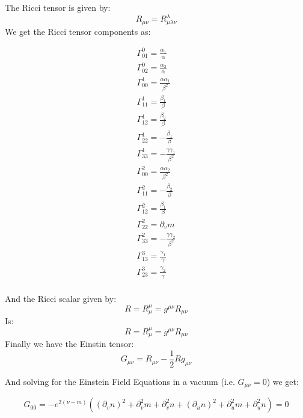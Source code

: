 \documentclass{article}
\begin{document}
The Ricci tensor is given by:
\begin{equation}
R_{\mu\nu}=R_{\mu\lambda\nu}^{\lambda}
\end{equation}
We get the Ricci tensor components as:
\begin{center}
\begin{equation}
\begin{array}{c}
\Gamma_{01}^{0}=\frac{\alpha_{1}}{\alpha}\\
\Gamma_{02}^{0}=\frac{\alpha_{2}}{\alpha}\\
\Gamma_{00}^{1}=\frac{\alpha \alpha_{1}}{\beta^{2}}\\
\Gamma_{11}^{1}=\frac{\beta_{1}}{\beta}\\
\Gamma_{12}^{1}=\frac{\beta_{2}}{\beta}\\
\Gamma_{22}^{1}=-\frac{\beta_{1}}{\beta}\\
\Gamma_{33}^{1}=-\frac{\gamma\gamma_{1}}{\beta^{2}}\\
\Gamma_{00}^{2}=\frac{\alpha\alpha_{2}}{\beta^{2}}\\
\Gamma_{11}^{2}=-\frac{\beta_{2}}{\beta}\\
\Gamma_{12}^{2}=\frac{\beta_{1}}{\beta}\\ 
\Gamma_{22}^{2}=\partial_{v}m\\
\Gamma_{33}^{2}=-\frac{\gamma\gamma_{2}}{\beta^{2}}\\
\Gamma_{13}^{3}=\frac{\gamma_{1}}{\gamma}\\
\Gamma_{23}^{3}=\frac{\gamma_{2}}{\gamma}\\
\end{array}
\end{equation}
\end{center}
And the Ricci scalar given by:
\begin{equation}
R=R_{\mu}^{\mu}=g^{\mu\nu}R_{\mu\nu}
\end{equation}
Is:
\begin{equation}
R=R_{\mu}^{\mu}=g^{\mu\nu}R_{\mu\nu}
\end{equation}
Finally we have the Einstin tensor:
\begin{equation}
G_{\mu\nu}=R_{\mu\nu}-\frac{1}{2}Rg_{\mu\nu}
\end{equation}

And solving for the Einstein Field Equations in a vacuum (i.e. $G_{\mu\nu}=0$)
we get:

\begin{equation}
G_{00}=-e^{2(\nu-m)}\left(\left(\partial_{v}n\right)^{2}+\partial_{v}^{2}m+\partial_{v}^{2}n+\left(\partial_{u}n\right)^{2}+\partial_{u}^{2}m+\partial_{u}^{2}n\right)=0\label{eq:G00}
\end{equation}
\end{document}
